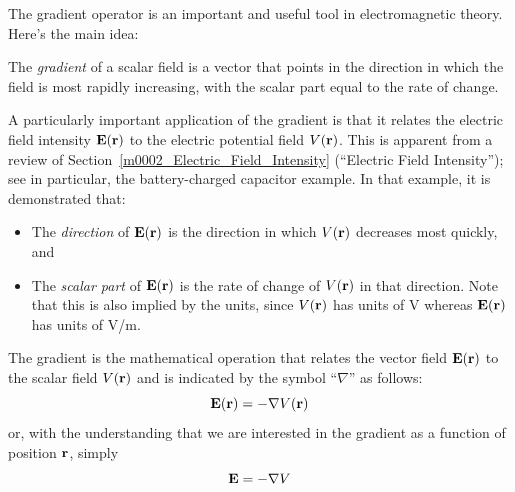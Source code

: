 

\label{m0098_Gradient} %

The gradient operator is an important and useful tool in electromagnetic theory.
Here's the main idea:
%
\begin{mdframed}[backgroundcolor=yellow!20,nobreak=true] 
The \emph{gradient} of a scalar field is a vector that points in the direction in which the field is most rapidly increasing, with the scalar part equal to the rate of change.
\end{mdframed}

A particularly important application of the gradient is that it relates the electric field intensity ${\bf E}({\bf r})$ to the electric potential field $V({\bf r})$.
This is apparent from a review of Section~\ref{m0002_Electric_Field_Intensity} (``Electric Field Intensity''); see in particular, the battery-charged capacitor example.
In that example, it is demonstrated that:
%
\begin{itemize} 
\item The \emph{direction} of ${\bf E}({\bf r})$ is the direction in which $V({\bf r})$ decreases most quickly, and
\item The \emph{scalar part} of ${\bf E}({\bf r})$ is the rate of change of $V({\bf r})$ in that direction. Note that this is also implied by the units, since $V({\bf r})$ has units of V whereas ${\bf E}({\bf r})$ has units of V/m.
\end{itemize}
%
The gradient is the mathematical operation that relates the vector field ${\bf E}({\bf r})$ to the scalar field $V({\bf r})$ and is indicated by the symbol ``$\nabla$'' as follows:
%
\begin{equation}
{\bf E}({\bf r}) = -\nabla V({\bf r})
\end{equation}
%
or, with the understanding that we are interested in the gradient as a function of position ${\bf r}$, simply
%
\begin{equation}
{\bf E} = -\nabla V
\end{equation}

